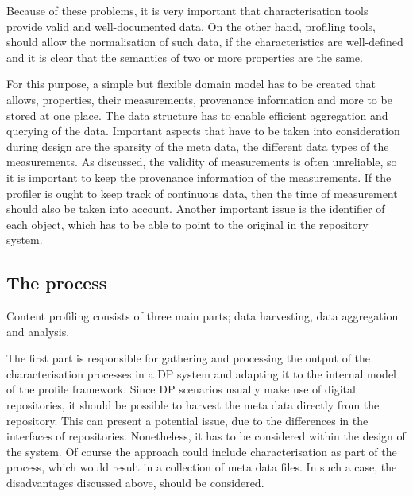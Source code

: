 Because of these problems, it is very important that characterisation tools provide valid and well-documented data. On the other hand, profiling tools, should allow the normalisation of such data, if the characteristics are well-defined and it is clear that the semantics of two or more properties are the same.

For this purpose, a simple but flexible domain model has to be created that allows, properties, their measurements, provenance information and more to be stored at one place. The data structure has to enable efficient aggregation and querying of the data. Important aspects that have to be taken into consideration during design are the sparsity of the meta data, the different data types of the measurements. As discussed, the validity of measurements is often unreliable, so it is important to keep the provenance information of the measurements. If the profiler is ought to keep track of continuous data, then the time of measurement should also be taken into account. Another important issue is the identifier of each object, which has to be able to point to the original in the repository system.



\subsection{The process}
Content profiling consists of three main parts; data harvesting, data aggregation and analysis.

The first part is responsible for gathering and processing the output of the characterisation processes in a DP system and adapting it to the internal model of the profile framework. Since DP scenarios usually make use of digital repositories, it should be possible to harvest the meta data directly from the repository. This can present a potential issue, due to the differences in the interfaces of repositories. Nonetheless, it has to be considered within the design of the system. Of course the approach could include characterisation as part of the process, which would result in a collection of meta data files. In such a case, the disadvantages discussed above, should be considered.

